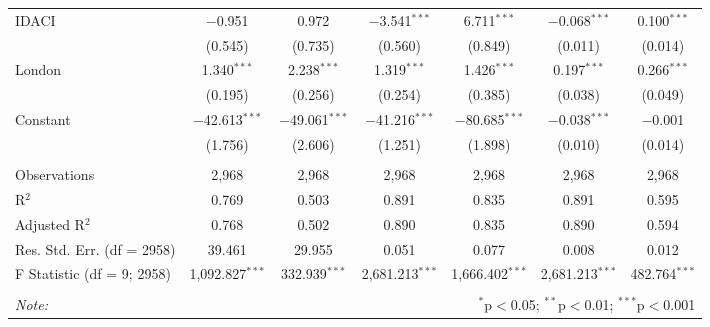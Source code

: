 \documentclass[11pt]{article}
\begin{document}
\begin{table}[!htbp]
\begin{tabular}{@{\extracolsep{5pt}}lcccccc}
  IDACI & $-$0.951 & 0.972 & $-$3.541$^{***}$ & 6.711$^{***}$ & $-$0.068$^{***}$ & 0.100$^{***}$ \\ 
  & (0.545) & (0.735) & (0.560) & (0.849) & (0.011) & (0.014) \\  
  London & 1.340$^{***}$ & 2.238$^{***}$ & 1.319$^{***}$ & 1.426$^{***}$ & 0.197$^{***}$ & 0.266$^{***}$ \\ 
  & (0.195) & (0.256) & (0.254) & (0.385) & (0.038) & (0.049) \\ 
  Constant & $-$42.613$^{***}$ & $-$49.061$^{***}$ & $-$41.216$^{***}$ & $-$80.685$^{***}$ & $-$0.038$^{***}$ & $-$0.001 \\ 
  & (1.756) & (2.606) & (1.251) & (1.898) & (0.010) & (0.014) \\ 
 \hline \\[-1.8ex] 
Observations & 2,968 & 2,968 & 2,968 & 2,968 & 2,968 & 2,968 \\ 
R$^{2}$ & 0.769 & 0.503 & 0.891 & 0.835 & 0.891 & 0.595 \\ 
Adjusted R$^{2}$ & 0.768 & 0.502 & 0.890 & 0.835 & 0.890 & 0.594 \\ 
Res. Std. Err. (df = 2958) & 39.461 & 29.955 & 0.051 & 0.077 & 0.008 & 0.012 \\ 
F Statistic (df = 9; 2958) & 1,092.827$^{***}$ & 332.939$^{***}$ & 2,681.213$^{***}$ & 1,666.402$^{***}$ & 2,681.213$^{***}$ & 482.764$^{***}$ \\ 
\hline 
\hline \\[-1.8ex] 
\textit{Note:}  & \multicolumn{6}{r}{$^{*}$p$<$0.05; $^{**}$p$<$0.01; $^{***}$p$<$0.001} \\ 
\end{tabular} 
\end{table} 
\end{document}
